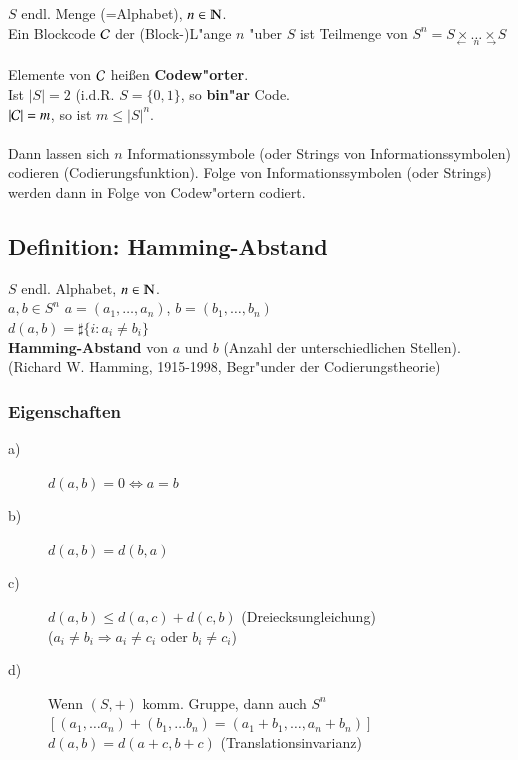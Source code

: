 $S$ endl. Menge (=Alphabet), $n \in \N$. \\
Ein Blockcode $\mathcal{C}$
der (Block-)L"ange $n$ "uber $S$ ist Teilmenge von $S^n=\underset{\longleftarrow \ \  n\ \  \longrightarrow}{S \times \ldots \times S}$ \\ %
\\
Elemente von $\mathcal{C}$ hei\ss en \textbf{Codew"orter}. \\
Ist $\left| S \right| = 2$ (i.d.R. $S=\lbrace 0,1 \rbrace$, so \textbf{bin"ar} Code.\\
$\left| \mathcal{C} \right| = m$, so ist $m \leq \left| S \right| ^ n$. \\
\\
Dann lassen sich $n$ Informationssymbole (oder Strings von Informationssymbolen) codieren (Codierungsfunktion). Folge von Informationssymbolen (oder Strings) werden dann in Folge von Codew"ortern codiert.

\subsection{Definition: Hamming-Abstand}
$S$ endl. Alphabet, $n \in \N$. \\
$a,b \in S^n$ $a=(a_1, \ldots, a_n)$, $b=(b_1, \ldots, b_n)$ \\
$d(a, b)= \sharp \lbrace i : a_i \neq b_i \rbrace$ \\
\textbf{Hamming-Abstand} von $a$ und $b$ (Anzahl der unterschiedlichen Stellen). \\
(Richard W. Hamming, 1915-1998, Begr"under der Codierungstheorie)

\subsubsection{Eigenschaften}
\begin{description}
	\item[a)] $d(a,b)=0 \Leftrightarrow a=b$
	\item[b)] $d(a,b)=d(b,a)$
	\item[c)] $d(a,b) \leq d(a,c) + d(c,b)$ (Dreiecksungleichung) \\
			($a_i \neq b_i \Rightarrow a_i \neq c_i$ oder $b_i \neq c_i$) 
	\item[d)] 	Wenn $(S,+)$ komm. Gruppe, dann auch $S^n$\\
				$[ (a_1,\ldots a_n) + (b_1, \ldots b_n) = (a_1+b_1,\ldots, a_n+b_n)]$\\
				$d(a,b)=d(a+c,b+c)$ (Translationsinvarianz)				
\end{description}

